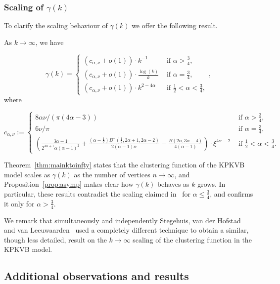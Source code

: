 \subsubsection{Scaling of $\gamma(k)$}


To clarify the scaling behaviour of $\gamma(k)$ we offer the following result.

\begin{proposition}\label{prop:asymp}
As $k\to\infty$, we have

$$ \gamma(k) = 
\left\{ \begin{array}{ll}
(c_{\alpha,\nu}+o(1)) \cdot k^{-1} &\text{ if } \alpha > \frac{3}{4}, \\
(c_{\alpha,\nu}+o(1)) \cdot \frac{\log(k)}{k}& \text{ if } \alpha = \frac{3}{4},\\
(c_{\alpha,\nu}+o(1)) \cdot k^{2-4\alpha} & \text{ if } \frac12 < \alpha < \frac34, 
\end{array} \right.,
$$
where 

$$ c_{\alpha,\nu} := 
\left\{ \begin{array}{cl}
8\alpha \nu / (\pi\left(4\alpha - 3\right)) & \text{ if } \alpha > \frac{3}{4}, \\
6 \nu / \pi & \text{ if } \alpha = \frac{3}{4},\\
 \left( \frac{3\alpha - 1}{2^{4\alpha+1}\alpha(\alpha-1)^2} 
	+ \frac{(\alpha - \frac{1}{2})B^-(\frac{1}{2},2\alpha + 1, 2\alpha - 2)}{2(\alpha - 1)\alpha} 
	- \frac{B(2\alpha, 3\alpha - 4)}{4(\alpha - 1)} \right)  \cdot \xi^{4\alpha-2} 
	& \text{ if } \frac12 < \alpha < \frac34.
\end{array} \right. $$
\end{proposition}

Theorem~\ref{thm:mainktoinfty} states that the clustering function of the KPKVB model scales as $\gamma(k)$ as the number of vertices $n\to\infty$, and
Proposition~\ref{prop:asymp} makes clear how $\gamma(k)$ behaves as $k$ grows.
In particular, these results contradict the scaling claimed in~\cite{krioukov2010hyperbolic} for 
$\alpha \leq \frac{3}{4}$, and confirms it only for $\alpha > \frac{3}{4}$.

We remark that simultaneously and independently Stegehuis, van der Hofstad and van Leeuwaarden~\cite{stegehuis2019scale} used a completely different technique to obtain a similar, though less detailed, result on the $k\to\infty$ scaling of the clustering function in the KPKVB model.


\subsection{Additional observations and results}


